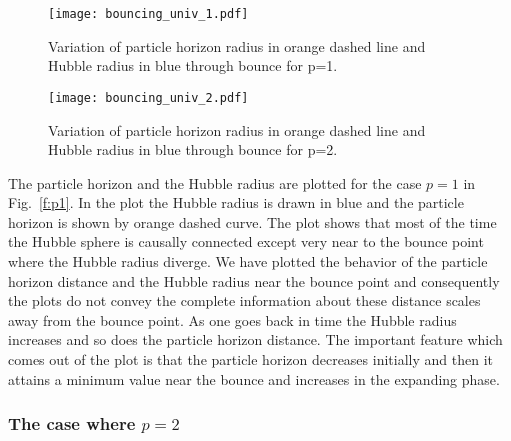 \documentclass[24pt]{article}
\begin{document}
\begin{figure}[t!]
\begin{minipage}[b]{0.5\linewidth}
\centering
\texttt{[image: bouncing\_univ\_1.pdf]}
\caption{Variation of particle horizon radius in orange dashed line
  and Hubble radius in blue through bounce for p=1.}
\label{f:p1}
\end{minipage}
\hspace{0.2cm}
\begin{minipage}[b]{0.5\linewidth}
\centering
\texttt{[image: bouncing\_univ\_2.pdf]}
\caption{Variation of particle horizon radius in orange dashed line
  and Hubble radius in blue through bounce for p=2.}
\label{f:p2}
\end{minipage}
\end{figure}
The particle horizon and the Hubble radius are plotted for the case
$p=1$ in Fig.~\ref{f:p1}. In the plot the Hubble radius is drawn in
blue and the particle horizon is shown by orange dashed curve.  The
plot shows that most of the time the Hubble sphere is causally
connected except very near to the bounce point where the Hubble radius
diverge. We have plotted the behavior of the particle horizon distance
and the Hubble radius near the bounce point and consequently the plots
do not convey the complete information about these distance scales
away from the bounce point. As one goes back in time the Hubble radius
increases and so does the particle horizon distance. The important
feature which comes out of the plot is that the particle horizon
decreases initially and then it attains a minimum value near the
bounce and increases in the expanding phase.
\subsubsection{The case where $p=2$}
\end{document}

